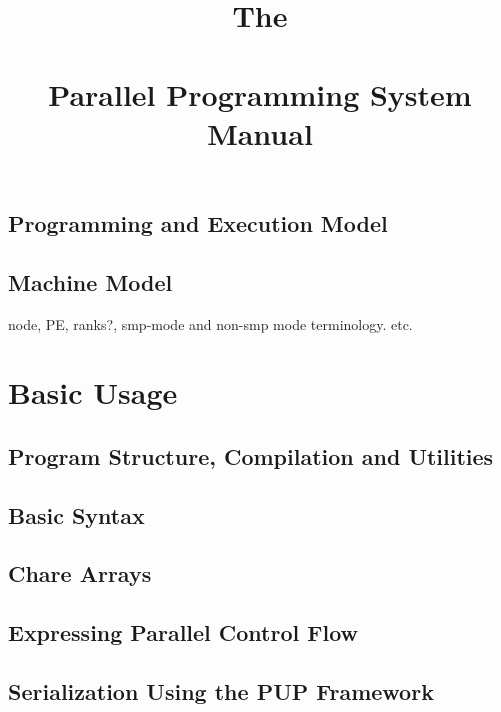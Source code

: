 \documentclass[10pt]{report}
\begin{document}
\title{The\\ \charm\\ Parallel Programming System\\ Manual}
\credits{\hspace{0 in}}
\maketitle


\chapter{Programming and Execution Model}



\chapter{Machine Model}
node, PE, ranks?, smp-mode and non-smp mode terminology. etc.

\part{Basic Usage}

\chapter{Program Structure, Compilation and Utilities}
  	
  
  

\chapter{Basic Syntax}
  	
  
  

\chapter{Chare Arrays}
  

\chapter{Expressing Parallel Control Flow}
  

\chapter{Serialization Using the PUP Framework}
  
\end{document}
